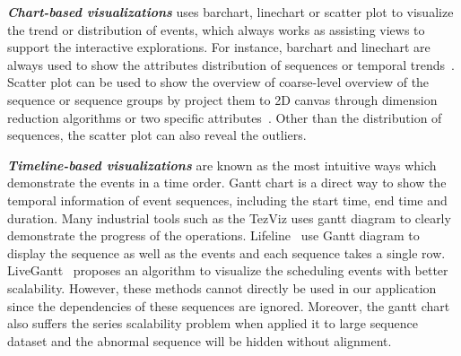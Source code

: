 \emph{\textbf{Chart-based visualizations}} uses barchart, linechart or scatter plot to visualize the trend or distribution of events, which always works as assisting views to support the interactive explorations. For instance, barchart and linechart are always used to show the attributes distribution of sequences or temporal trends~\cite{gotz2019visual, cappers2017exploring}. Scatter plot can be used to show the overview of coarse-level overview of the sequence or sequence groups by project them to 2D canvas through dimension reduction algorithms or two specific attributes~\cite{wu2020visual, malik2016high, gotz2019visual}. Other than the  distribution of sequences, the scatter plot can also reveal the outliers. 

\emph{\textbf{Timeline-based visualizations}} are known as the most intuitive ways which demonstrate the events in a time order. Gantt chart is a direct way to show the temporal information of event sequences, including the start time, end time and duration. Many industrial tools such as the TezViz uses gantt diagram to clearly demonstrate the progress of the operations. Lifeline~\cite{plaisant1996lifelines} use Gantt diagram to display the sequence as well as the events and each sequence takes a single row. LiveGantt~\cite{jo2014livegantt} proposes an algorithm to visualize the scheduling events with better scalability. However, these methods cannot directly be used in our application since the dependencies of these sequences are ignored. Moreover, the gantt chart also suffers the series scalability problem when applied it to large sequence dataset and the abnormal sequence will be hidden without alignment.
